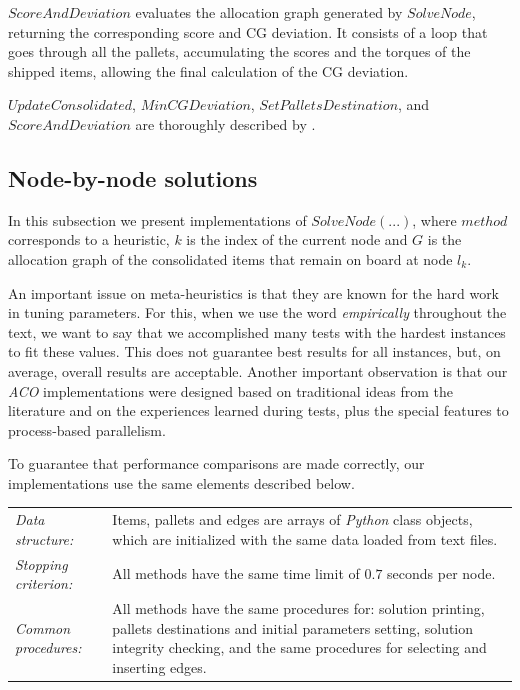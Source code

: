 \documentclass[preprint,authoryear]{elsarticle}
\begin{document}
$ScoreAndDeviation$ evaluates the allocation graph generated by $SolveNode$, returning the corresponding score and CG deviation. It consists of a loop that goes through all the pallets, accumulating the scores and the torques of the shipped items, allowing the final calculation of the CG deviation.

$UpdateConsolidated$, $MinCGDeviation$, $SetPalletsDestination$, and $ScoreAndDeviation$ are thoroughly described by \cite{MesquitaSanches2023}.


\subsection{Node-by-node solutions}
\label{methods}


In this subsection we present implementations of $SolveNode(...)$, where $method$\/ corresponds to a heuristic, $k$\/ is the index of the current node and $G$\/ is the allocation graph of the consolidated items that remain on board at node $l_k$.

An important issue on meta-heuristics is that they are known for the hard work in tuning parameters. For this, when we use the word {\it empirically}\/ throughout the text, we want to say that we accomplished many tests with the hardest instances to fit these values. This does not guarantee best results for all instances, but, on average, overall results are acceptable. Another important observation is that our {\it ACO} implementations were designed based on traditional ideas from the literature \cite{Fidanova2006} and on the experiences learned during tests, plus the special features to process-based parallelism.

To guarantee that performance comparisons are made correctly, our implementations use the same elements described below.


\bgroup
\def\arraystretch{1.2}
\begin{table}[H]
	\centering
	\small
	\begin{tabular}{CD}
		
		{\it Data structure:}     & Items, pallets and edges are arrays of \emph{Python} class objects, which are initialized with the same data loaded from text files. \\
		
		{\it Stopping criterion:} & All methods have the same time limit of $0.7$ seconds per node.\\
		
		{\it Common procedures:}  & All methods have the same procedures for: solution printing, pallets destinations and initial parameters setting, solution integrity checking, and the same procedures for selecting and inserting edges.\\

	\end{tabular}
	\normalsize
\end{table}
\egroup
\end{document}
